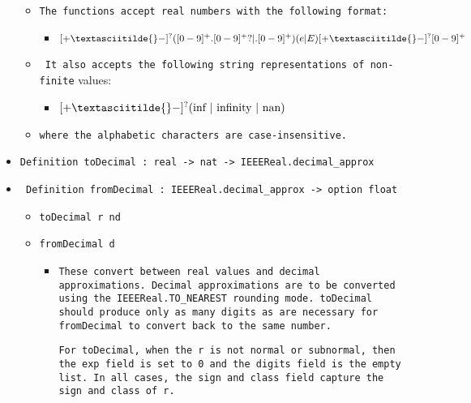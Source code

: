 \documentclass[11pt]{report}
\begin{document}
\begin{itemize}
\begin{itemize}
\item  \texttt{The functions accept real numbers with the following format:}

\begin{itemize}
\item  $[+ \textasciitilde{} -]^?([0-9]^+.[0-9]^+? | .[0-9]^+)(e|E)[+ \textasciitilde{} -]^?[0-9]^+$

\end{itemize}

\item \texttt{ It also accepts the following string representations of non-finite} values:

\begin{itemize}
\item $[+ \textasciitilde{} -]^?(\text{inf | infinity | nan})$

\end{itemize}

\item  \texttt{where the alphabetic characters are case-insensitive.}



\end{itemize}

\item  \texttt{Definition toDecimal : real -> nat -> IEEEReal.decimal\_approx}

\item \texttt{ Definition fromDecimal : IEEEReal.decimal\_approx -> option float}

\begin{itemize}
\item  \texttt{toDecimal r nd}

\item  \texttt{fromDecimal d}

\begin{itemize}
\item  \begin{flushleft} \texttt{These convert between real values and decimal approximations. Decimal approximations are to be converted using the IEEEReal.TO\_NEAREST rounding mode. toDecimal should produce only as many digits as are necessary for fromDecimal to convert back to the same number. }
\coqdocemptyline

\texttt{For toDecimal, when the r is not normal or subnormal, then the exp field is set to 0 and the digits field is the empty list. In all cases, the sign and class field capture the sign and class of r. }
\coqdocemptyline


\end{flushleft}
\end{itemize}
\end{itemize}
\end{itemize}
\end{document}
